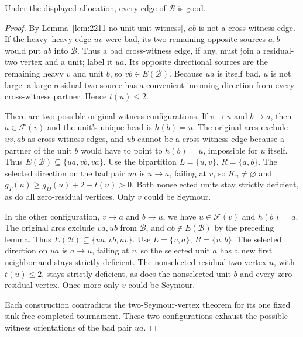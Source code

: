 \begin{lemma}
\label{lem:2211-all-witness-edges-good}
Under the displayed allocation, every edge of $\mathcal B$ is good.
\end{lemma}
\begin{proof}
By Lemma~\ref{lem:2211-no-unit-unit-witness}, $ab$ is not a
cross-witness edge. If the heavy--heavy edge $uv$ were bad,
its two remaining opposite sources $a,b$ would put $ab$ into
$\mathcal B$. Thus a bad cross-witness edge, if any, must join a
residual-two vertex and a unit; label it $ua$.
Its opposite directional sources are the remaining heavy $v$
and unit $b$, so $vb\in E(\mathcal B)$.
Because $ua$ is itself bad, $u$ is not large: a large residual-two
source has a convenient incoming direction from every cross-witness
partner. Hence $t(u)\le2$.

There are two possible original witness configurations.
If $v\to u$ and $b\to a$, then $a\in\mathcal F(v)$ and
the unit's unique head is $h(b)=u$.
The original arcs exclude $uv,ab$ as cross-witness edges,
and $ub$ cannot be a cross-witness edge because a partner of the
unit $b$ would have to point to $h(b)=u$, impossible for $u$ itself.
Thus $E(\mathcal B)\subseteq\{ua,vb,va\}$.
Use the bipartition $L=\{u,v\}$, $R=\{a,b\}$.
The selected direction on the bad pair $ua$ is $u\to a$,
failing at $v$, so $K_u\ne\varnothing$ and
$g_T(u)\ge g_D(u)+2-t(u)>0$.
Both nonselected units stay strictly deficient, as do all
zero-residual vertices. Only $v$ could be Seymour.

In the other configuration, $v\to a$ and $b\to u$,
we have $u\in\mathcal F(v)$ and $h(b)=a$.
The original arcs exclude $va,ub$ from $\mathcal B$, and
$ab\notin E(\mathcal B)$ by the preceding lemma.
Thus $E(\mathcal B)\subseteq\{ua,vb,uv\}$.
Use $L=\{v,a\}$, $R=\{u,b\}$.
The selected direction on $ua$ is $a\to u$, failing at $v$,
so the selected unit $a$ has a new first neighbor and stays
strictly deficient. The nonselected residual-two vertex $u$,
with $t(u)\le2$, stays strictly deficient, as does the nonselected
unit $b$ and every zero-residual vertex.
Once more only $v$ could be Seymour.

Each construction contradicts the two-Seymour-vertex theorem for
its one fixed sink-free completed tournament. These two configurations
exhaust the possible witness orientations of the bad pair $ua$.
\end{proof}

